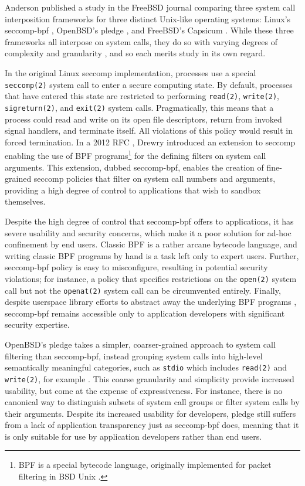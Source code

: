 \documentclass[dvipsnames, 12pt]{article}
\begin{document}
Anderson published a study in the FreeBSD journal \cite{anderson2017_comparison}
comparing three system call interposition frameworks for three distinct
Unix-like operating systems: Linux's seccomp-bpf
\cite{seccomp_bpf,drewry2012_seccomp_bpf}, OpenBSD's pledge \cite{pledge}, and
FreeBSD's Capsicum \cite{capsicum, watson2010_capsicum}. While these three
frameworks all interpose on system calls, they do so with varying degrees of
complexity and granularity \cite{anderson2017_comparison}, and so each merits
study in its own regard.

In the original Linux seccomp implementation, processes use a special
\texttt{seccomp(2)} system call to enter a secure computing state. By default,
processes that have entered this state are restricted to performing
\texttt{read(2)}, \texttt{write(2)}, \texttt{sigreturn(2)}, and \texttt{exit(2)}
system calls.  Pragmatically, this means that a process could read and write on
its open file descriptors, return from invoked signal handlers, and terminate
itself. All violations of this policy would result in forced termination. In
a 2012 RFC \cite{drewry2012_seccomp_bpf}, Drewry introduced an extension to
seccomp enabling the use of BPF programs\footnote{BPF is a special bytecode
language, originally implemented for packet filtering in BSD Unix
\cite{classic_bpf}.} for the defining filters on system call arguments. This
extension, dubbed seccomp-bpf, enables the creation of fine-grained seccomp
policies that filter on system call numbers and arguments, providing a high
degree of control to applications that wish to sandbox themselves.

Despite the high degree of control that seccomp-bpf offers to applications, it
has severe usability and security concerns, which make it a poor solution for
ad-hoc confinement by end users. Classic BPF \cite{classic_bpf} is a rather
arcane bytecode language, and writing classic BPF programs by hand is a task
left only to expert users. Further, seccomp-bpf policy is easy to misconfigure,
resulting in potential security violations; for instance, a policy that
specifies restrictions on the \texttt{open(2)} system call but not the
\texttt{openat(2)} system call can be circumvented entirely. Finally, despite
userspace library efforts to abstract away the underlying BPF programs
\cite{libseccomp}, seccomp-bpf remains accessible only to application developers
with significant security expertise.

OpenBSD's pledge \cite{pledge} takes a simpler, coarser-grained approach to
system call filtering than seccomp-bpf, instead grouping system calls into
high-level semantically meaningful categories, such as \texttt{stdio} which
includes \texttt{read(2)} and \texttt{write(2)}, for example
\cite{anderson2017_comparison}. This coarse granularity and simplicity provide
increased usability, but come at the expense of expressiveness. For instance,
there is no canonical way to distinguish subsets of system call groups or filter
system calls by their arguments.  Despite its increased usability for
developers, pledge still suffers from a lack of application transparency just as
seccomp-bpf does, meaning that it is only suitable for use by application
developers rather than end users.
\end{document}
